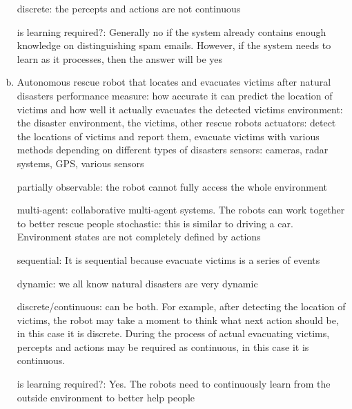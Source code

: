 \documentclass[11pt]{article}
\begin{document}
\begin{enumerate}[(a)]
    discrete: the percepts and actions are not continuous \newline
    
    is learning required?: Generally no if the system already contains enough knowledge on distinguishing spam emails. However, if the system needs to learn as it processes, then the answer will be yes \newline
    
    
    \item Autonomous rescue robot that locates and evacuates victims after natural disasters
    performance measure: how accurate it can predict the location of victims and how well it actually evacuates the detected victims \newline
    environment: the disaster environment, the victims, other rescue robots \newline
    actuators: detect the locations of victims and report them, evacuate victims with various methods depending on different types of disasters  \newline
    sensors: cameras, radar systems, GPS, various sensors  \newline
    
    partially observable: the robot cannot fully access the whole environment \newline
    
    multi-agent: collaborative multi-agent systems. The robots can work together to better rescue people \newline
    stochastic: this is similar to driving a car. Environment states are not completely defined by actions \newline
    
    sequential: It is sequential because evacuate victims is a series of events \newline
    
    dynamic: we all know natural disasters are very dynamic \newline
    
    discrete/continuous: can be both. For example, after detecting the location of victims, the robot may take a moment to think what next action should be, in this case it is discrete. During the process of actual evacuating victims, percepts and actions may be required as continuous, in this case it is continuous. \newline
    
    is learning required?: Yes. The robots need to continuously learn from the outside environment to better help people \newline
\end{enumerate}
\end{document}
